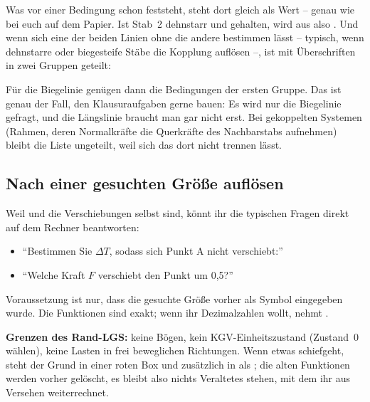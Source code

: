 \begin{center}
\code{["w1(x1=0)=0";"EIw1''(x1=0)=0";"w1(x1=l)=w2(x2=0)";\dots]}
\end{center}

Was vor einer Bedingung schon feststeht, steht dort gleich als Wert -- genau wie bei euch auf dem
Papier. Ist Stab~2 dehnstarr und gehalten, wird aus  also
. Und wenn sich eine der beiden Linien ohne die andere bestimmen lässt --
typisch, wenn dehnstarre oder biegesteife Stäbe die Kopplung auflösen --, ist  mit
Überschriften in zwei Gruppen geteilt:

\begin{center}
\end{center}

Für die Biegelinie genügen dann die Bedingungen der ersten Gruppe. Das ist genau der Fall, den
Klausuraufgaben gerne bauen: Es wird nur die Biegelinie gefragt, und die Längslinie braucht man
gar nicht erst. Bei gekoppelten Systemen (Rahmen, deren Normalkräfte die Querkräfte des
Nachbarstabs aufnehmen) bleibt die Liste ungeteilt, weil sich das dort nicht trennen lässt.

\subsection{Nach einer gesuchten Größe auflösen}

Weil  und  die Verschiebungen selbst sind, könnt ihr die typischen Fragen
direkt auf dem Rechner beantworten:

\begin{itemize}
  \item \enquote{Bestimmen Sie $\Delta T$, sodass sich Punkt A nicht verschiebt:}\\
  \item \enquote{Welche Kraft $F$ verschiebt den Punkt um 0,5?}\\
\end{itemize}

Voraussetzung ist nur, dass die gesuchte Größe vorher als Symbol eingegeben wurde. Die Funktionen
sind exakt; wenn ihr Dezimalzahlen wollt, nehmt .

\textbf{Grenzen des Rand-LGS:} keine Bögen, kein KGV-Einheitszustand (Zustand~0 wählen), keine
Lasten in frei beweglichen Richtungen. Wenn etwas schiefgeht, steht der Grund in einer roten Box
und zusätzlich in  als ; die alten Funktionen werden vorher
gelöscht, es bleibt also nichts Veraltetes stehen, mit dem ihr aus Versehen weiterrechnet.

